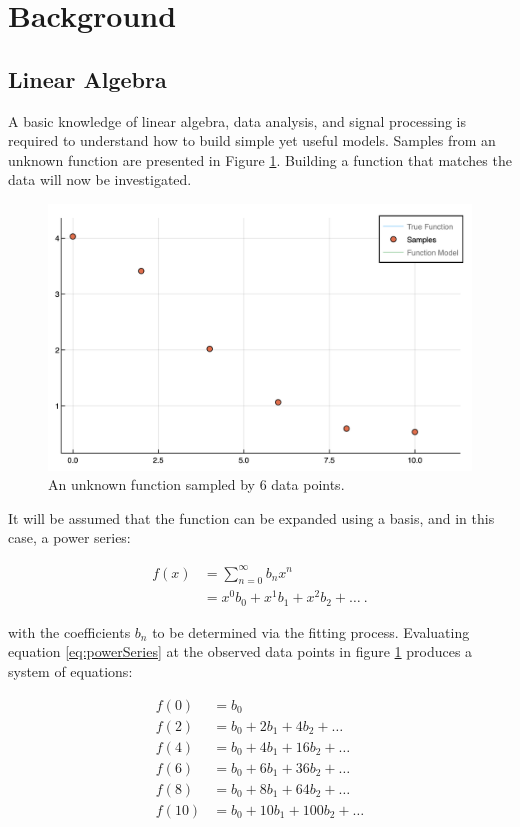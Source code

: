 \section{Background}\label{Sect:background}
\subsection{Linear Algebra}\label{Sect:linearAlgebra}
A basic knowledge of linear algebra, data analysis, and signal processing is required to understand how to build simple yet useful models. Samples from an unknown function are presented in Figure \ref{fig:func1Samples}. Building a function that matches the data will now be investigated.

\begin{figure}[h]
\includegraphics[scale = 0.4]{Figures/func1Samples}
\caption{An unknown function sampled by 6 data points.
\label{fig:func1Samples}} 
\end{figure}

\par It will be assumed that the function can be expanded using a basis, and in this case, a power series:

\begin{align}
f(x) &= \sum_{n=0}^\infty b_n x^n
	\label{eq:powerSum}\\ 
&= x^0b_0 + x^1b_1 + x^2b_2 + \ldots\ .
	\label{eq:powerSeries}
\end{align}

with the coefficients $b_n$ to be determined via the fitting process. Evaluating equation \ref{eq:powerSeries} at the observed data points in figure \ref{fig:func1Samples} produces a system of equations:

\begin{align}
f(0) &= b_0 \nonumber \\
f(2) &= b_0 + 2 b_1 + 4 b_2 + \dots \nonumber \\
f(4) &= b_0 + 4 b_1 + 16 b_2 + \dots \nonumber \\
f(6) &= b_0 + 6 b_1 + 36 b_2 + \dots \nonumber \\
f(8) &= b_0 + 8 b_1 + 64 b_2 + \dots \nonumber \\
f(10) &= b_0 + 10 b_1 + 100 b_2 + \dots\\
\end{align}

